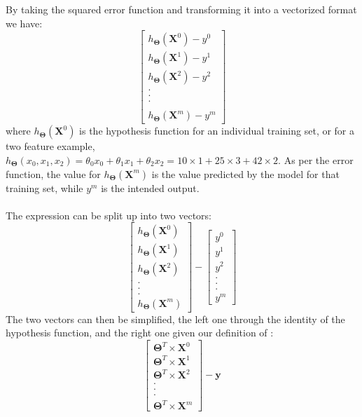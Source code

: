 \documentclass[a4paper,12pt]{article}
\begin{document}
By taking the squared error function and transforming it into a vectorized format we have:
\[\begin{bmatrix} h_{\boldsymbol{\Theta}} (\boldsymbol{X}^0) - y^0 \\ h_{\boldsymbol{\Theta}} (\boldsymbol{X}^1) - y^1 \\ h_{\boldsymbol{\Theta}} (\boldsymbol{X}^2) - y^2 \\ . \\ . \\ . \\  \\ h_{\boldsymbol{\Theta}} (\boldsymbol{X}^m) - y^m\end{bmatrix}\]
where $h_{\boldsymbol{\Theta}} (\boldsymbol{X}^0)$ is the hypothesis function for an individual training set, or for a two feature example, $h_{\boldsymbol{\Theta}} (x_0, x_1, x_2) = \theta_0x_0 + \theta_1x_1 + \theta_2x_2 = 10\times 1 + 25 \times 3 + 42 \times 2$. As per the error function, the value for $h_{\boldsymbol{\Theta}} (\boldsymbol{X}^m)$ is the value predicted by the model for that training set, while $y^m$ is the intended output.
\\
\\
The expression can be split up into two vectors: 
\[\begin{bmatrix} h_{\boldsymbol{\Theta}} (\boldsymbol{X}^0) \\ h_{\boldsymbol{\Theta}} (\boldsymbol{X}^1) \\ h_{\boldsymbol{\Theta}} (\boldsymbol{X}^2) \\ . \\ . \\ . \\ h_{\boldsymbol{\Theta}} (\boldsymbol{X}^m) \end{bmatrix} - \begin{bmatrix} y^0 \\ y^1 \\ y^2 \\ . \\ . \\ . \\ y^m \end{bmatrix}\]
The two vectors can then be simplified, the left one through the identity of the hypothesis function, and the right one given our definition of \unboldmath:
\[\begin{bmatrix} \boldsymbol{\Theta}^T \times \boldsymbol{X}^0 \\ \boldsymbol{\Theta}^T \times \boldsymbol{X}^1 \\ \boldsymbol{\Theta}^T \times \boldsymbol{X}^2 \\ . \\ . \\ . \\ \boldsymbol{\Theta}^T \times \boldsymbol{X}^m \end{bmatrix} - \boldsymbol{y}\]
\end{document}
